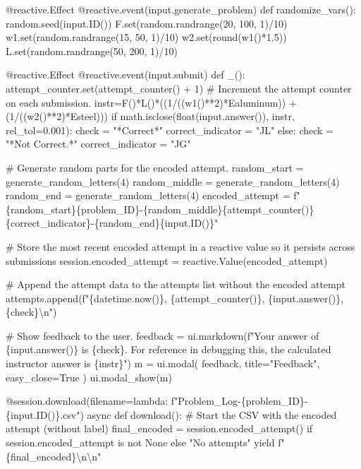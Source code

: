 \documentclass[
  letterpaper,
  DIV=11,
  numbers=noendperiod]{scrreprt}
\newenvironment{Shaded}{\begin{snugshade}}{\end{snugshade}}
\newcommand{\NormalTok}[1]{\textcolor[rgb]{0.00,0.23,0.31}{#1}}
\begin{document}
\begin{Shaded}
\begin{Highlighting}[]
\NormalTok{    @reactive.Effect}
\NormalTok{    @reactive.event(input.generate\_problem)}
\NormalTok{    def randomize\_vars():}
\NormalTok{        random.seed(input.ID())}
\NormalTok{        F.set(random.randrange(20, 100, 1)/10)}
\NormalTok{        w1.set(random.randrange(15, 50, 1)/10)}
\NormalTok{        w2.set(round(w1()*1.5))}
\NormalTok{        L.set(random.randrange(50, 200, 1)/10)}
        
\NormalTok{    @reactive.Effect}
\NormalTok{    @reactive.event(input.submit)}
\NormalTok{    def \_():}
\NormalTok{        attempt\_counter.set(attempt\_counter() + 1)  \# Increment the attempt counter on each submission.}
\NormalTok{        instr=F()*L()*((1/((w1()**2)*Ealuminum)) + (1/((w2()**2)*Esteel)))}
\NormalTok{        if math.isclose(float(input.answer()), instr, rel\_tol=0.001):}
\NormalTok{            check = "*Correct*"}
\NormalTok{            correct\_indicator = "JL"}
\NormalTok{        else:}
\NormalTok{            check = "*Not Correct.*"}
\NormalTok{            correct\_indicator = "JG"}

\NormalTok{        \# Generate random parts for the encoded attempt.}
\NormalTok{        random\_start = generate\_random\_letters(4)}
\NormalTok{        random\_middle = generate\_random\_letters(4)}
\NormalTok{        random\_end = generate\_random\_letters(4)}
\NormalTok{        encoded\_attempt = f"\{random\_start\}\{problem\_ID\}{-}\{random\_middle\}\{attempt\_counter()\}\{correct\_indicator\}{-}\{random\_end\}\{input.ID()\}"}

\NormalTok{        \# Store the most recent encoded attempt in a reactive value so it persists across submissions}
\NormalTok{        session.encoded\_attempt = reactive.Value(encoded\_attempt)}

\NormalTok{        \# Append the attempt data to the attempts list without the encoded attempt}
\NormalTok{        attempts.append(f"\{datetime.now()\}, \{attempt\_counter()\}, \{input.answer()\}, \{check\}\textbackslash{}n")}

\NormalTok{        \# Show feedback to the user.}
\NormalTok{        feedback = ui.markdown(f"Your answer of \{input.answer()\} is \{check\}. For reference in debugging this, the calculated instructor answer is \{instr\}")}
\NormalTok{        m = ui.modal(}
\NormalTok{            feedback,}
\NormalTok{            title="Feedback",}
\NormalTok{            easy\_close=True}
\NormalTok{        )}
\NormalTok{        ui.modal\_show(m)}

\NormalTok{    @session.download(filename=lambda: f"Problem\_Log{-}\{problem\_ID\}{-}\{input.ID()\}.csv")}
\NormalTok{    async def download():}
\NormalTok{        \# Start the CSV with the encoded attempt (without label)}
\NormalTok{        final\_encoded = session.encoded\_attempt() if session.encoded\_attempt is not None else "No attempts"}
\NormalTok{        yield f"\{final\_encoded\}\textbackslash{}n\textbackslash{}n"}
        

\end{Highlighting}
\end{Shaded}
\end{document}
